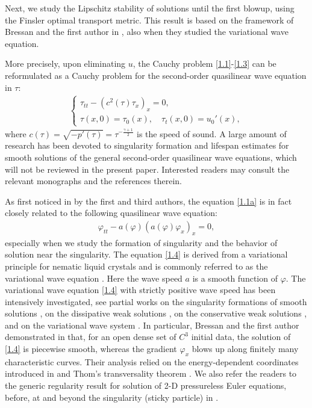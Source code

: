 \documentclass[11pt,reqno]{article}
\newcommand{\dps}{\displaystyle}
\newcommand{\fr}{\frac}
\numberwithin{equation}{section}
\begin{document}
Next, we study the Lipschitz stability of solutions until the first blowup, using the Finsler optimal transport metric. This result is based on the framework of Bressan and the first author in \cite{BC1,BC2,BHY}, also when they studied the variational wave equation.

More precisely, upon eliminating $u$, the Cauchy problem \eqref{1.1}-\eqref{1.3} can be reformulated as a Cauchy problem for the second-order quasilinear wave equation in $\tau$:
\begin{align}\label{1.1a}
\left\{
\begin{array}{l}
\dps \tau_{tt}-(c^2(\tau)\tau_x)_x=0,\\
\dps \tau(x,0)=\tau_0(x),\quad \tau_t(x,0)=u_{0}'(x),
\end{array}
\right.
\end{align}
where $c(\tau)=\sqrt{-p'(\tau)}=\tau^{-\fr{\gamma+1}{2}}$ is the speed of sound.
A large amount of research has been devoted to singularity formation and lifespan estimates for smooth solutions of the general second-order quasilinear wave equations, which will not be reviewed in the present paper. Interested readers may consult the relevant monographs \cite{Ali, Chr1, Chr3, John1, Maj, Spe} and the references therein.

As first noticed in \cite{CS} by the first and third authors, the equation \eqref{1.1a} is in fact closely related to the following quasilinear wave equation:
\begin{align}\label{1.4}
\varphi_{tt}-a(\varphi)(a(\varphi)\varphi_x)_x=0,
\end{align}
especially when we study the formation of singularity and the behavior of solution near the singularity.
The equation \eqref{1.4} is derived from a variational principle for nematic liquid crystals and is commonly referred to as the variational wave equation \cite{HS}. Here the wave speed $a$ is a smooth function of $\varphi$. The variational wave equation \eqref{1.4} with strictly positive wave speed has been intensively investigated, see partial works on the singularity formations of smooth solutions \cite{GHZ}, on the dissipative weak solutions \cite{BH, ZZ1, ZZ2}, on the conservative weak solutions \cite{BZ, BCZ, CS, HR}, and on the variational wave system \cite{CCD, ZZ3, ZZ4}. In particular, Bressan and the first author demonstrated in \cite{BC1} that, for an open dense set of $C^3$ initial data, the solution of \eqref{1.4} is piecewise smooth, whereas the gradient $\varphi_x$ blows up along finitely many characteristic curves. Their analysis relied on the energy-dependent coordinates introduced in \cite{BZ} and Thom's transversality theorem \cite{Thom}. We also refer the readers to the generic regularity result for solution of 2-D pressureless Euler equations, before, at and beyond the singularity (sticky particle) in \cite{BCH1,BCH2}.
\end{document}
